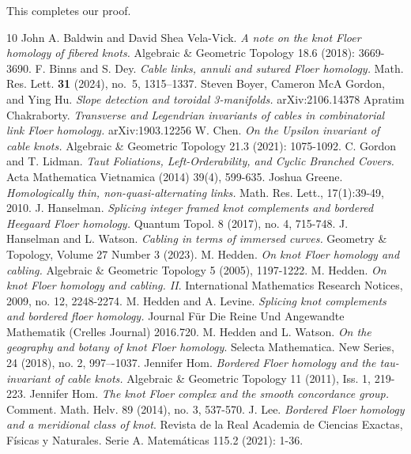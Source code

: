 \documentclass[11pt,reqno]{amsart}
\theoremstyle{definition}
\newtheorem *{remark}{Remark}
\begin{document}
 This completes our proof. \qedsymbol
  \vspace{5mm}
  





\begin{thebibliography}{10}
John A. Baldwin and David Shea Vela-Vick. 
\textit{A note on the knot Floer homology of fibered knots.}
Algebraic \& Geometric Topology 18.6 (2018): 3669-3690.
F. Binns and S. Dey.
\textit{Cable links, annuli and sutured Floer homology.}
Math. Res. Lett. {\bf 31} (2024), no.~5, 1315--1337.
Steven Boyer, Cameron McA Gordon, and Ying Hu. 
\textit{Slope detection and toroidal 3-manifolds.}
arXiv:2106.14378
Apratim Chakraborty.
\textit{Transverse and Legendrian invariants of cables in combinatorial link Floer homology.}
arXiv:1903.12256 
W. Chen.
\textit{On the Upsilon invariant of cable knots.}
Algebraic \& Geometric Topology 21.3 (2021): 1075-1092.
C. Gordon and T. Lidman.
\textit{Taut Foliations, Left-Orderability, and Cyclic Branched Covers.}
Acta Mathematica Vietnamica (2014) 39(4), 599-635.
Joshua Greene.
\textit{Homologically thin, non-quasi-alternating links.}
Math. Res. Lett., 17(1):39-49, 2010.
J. Hanselman.
\textit{Splicing integer framed knot complements and bordered Heegaard Floer homology.}
Quantum Topol. 8 (2017), no. 4, 715-748.
J. Hanselman and L. Watson.
\textit{Cabling in terms of immersed curves.}
Geometry \& Topology, Volume 27 Number 3 (2023).
M. Hedden.
\textit{On knot Floer homology and cabling.}
Algebraic \& Geometric Topology 5 (2005), 1197-1222. 
M. Hedden.
\textit{On knot Floer homology and cabling. II}.
International Mathematics Research Notices, 2009, no. 12, 2248-2274. 
M. Hedden and A. Levine.
\textit{Splicing knot complements and bordered floer homology.}
Journal Für Die Reine Und Angewandte Mathematik (Crelles Journal) 2016.720. 
M. Hedden and L. Watson.
\textit{On the geography and botany of knot Floer homology}.
Selecta Mathematica. New Series, 24 (2018), no. 2, 997–-1037.
Jennifer Hom.
\textit{Bordered Floer homology and the tau-invariant of cable knots.}
Algebraic \& Geometric Topology 11 (2011), Iss. 1, 219-223.
Jennifer Hom.
\textit{The knot Floer complex and the smooth concordance group.}
Comment. Math. Helv. 89 (2014), no. 3, 537-570. 
J. Lee.
\textit{Bordered Floer homology and a meridional class of knot}.
Revista de la Real Academia de Ciencias Exactas, Físicas y Naturales. Serie A. Matemáticas 115.2 (2021): 1-36. 


\end{thebibliography}
\end{document}
